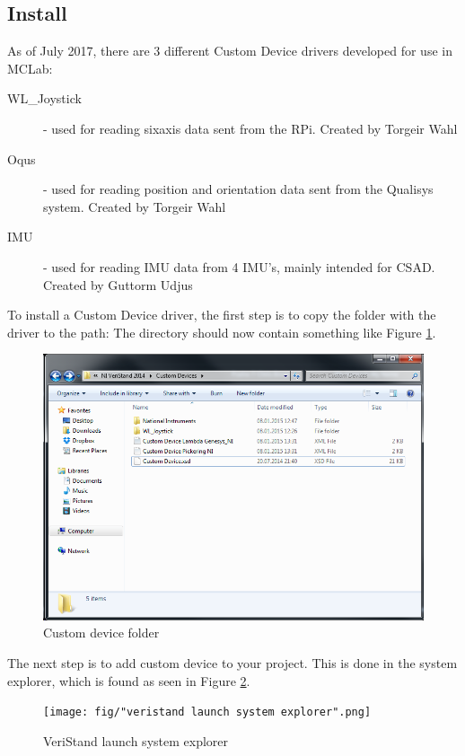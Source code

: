 \documentclass[a4paper,english]{report}
\begin{document}
\subsection{Install}\label{subsec: Installing custom device driver}
As of July 2017, there are 3 different Custom Device drivers developed for use in MCLab: 
\begin{description}
	\item [WL\_Joystick] - used for reading sixaxis data sent from the RPi. Created by Torgeir Wahl
	\item [Oqus] - used for reading position and orientation data sent from the Qualisys system. Created by Torgeir Wahl
	\item [IMU] - used for reading IMU data from 4 IMU's, mainly intended for CSAD. Created by Guttorm Udjus
\end{description}
To install a Custom Device driver, the first step is to copy the folder with the driver to the path: 
The directory should now contain something like Figure \ref{fig: custom device folder}.
\begin{figure}[htb!]
	\centering \includegraphics[scale=0.45]{fig/custom_devices_folder.png}
	\caption{Custom device folder}
	\label{fig: custom device folder} 
\end{figure}
The next step is to add custom device to your project. This is done in the system explorer, which is found as seen in Figure \ref{fig: veristand launch system explorer}.
\begin{figure}[htb!]
	\centering \texttt{[image: fig/"veristand launch system explorer".png]}
	\caption{VeriStand launch system explorer}
	\label{fig: veristand launch system explorer} 
\end{figure}
\end{document}
